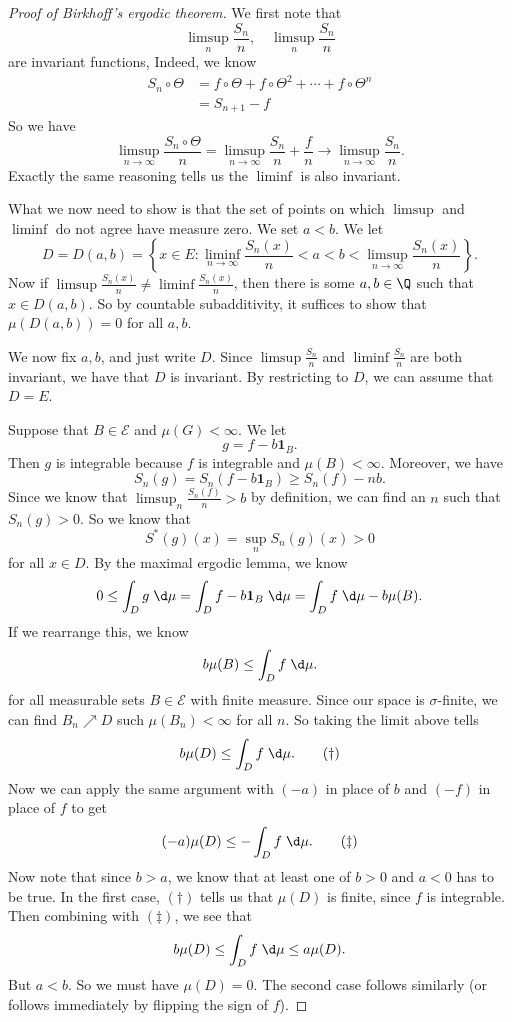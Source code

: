 \documentclass[a4paper]{article}
\begin{document}
\begin{proof}[Proof of Birkhoff's ergodic theorem]
  We first note that
  \[
    \limsup_n \frac{S_n}{n},\quad \limsup_n \frac{S_n}{n}
  \]
  are invariant functions, Indeed, we know
  \begin{align*}
    S_n \circ \Theta &= f \circ \Theta + f \circ \Theta^2 + \cdots + f \circ \Theta^n\\
    &= S_{n + 1} - f
  \end{align*}
  So we have
  \[
    \limsup_{n \to \infty} \frac{S_n \circ \Theta}{n} = \limsup_{n \to \infty} \frac{S_n}{n} + \frac{f}{n} \to \limsup_{n \to \infty} \frac{S_n}{n}.
  \]
  Exactly the same reasoning tells us the $\liminf$ is also invariant.

  What we now need to show is that the set of points on which $\limsup$ and $\liminf$ do not agree have measure zero. We set $a < b$. We let
  \[
    D = D(a, b) = \left\{x \in E: \liminf_{n \to \infty} \frac{S_n(x)}{n} < a < b < \limsup_{n \to \infty} \frac{S_n(x)}{n}\right\}.
  \]
  Now if $\limsup \frac{S_n(x)}{n} \not= \liminf \frac{S_n(x)}{n}$, then there is some $a , b \in \Q$ such that $x \in D(a, b)$. So by countable subadditivity, it suffices to show that $\mu(D(a, b)) = 0$ for all $a, b$.

  We now fix $a, b$, and just write $D$. Since $\limsup \frac{S_n}{n}$ and $\liminf \frac{S_n}{n}$ are both invariant, we have that $D$ is invariant. By restricting to $D$, we can assume that $D = E$.

  Suppose that $B \in \mathcal{E}$ and $\mu(G) < \infty$. We let
  \[
    g = f - b \mathbf{1}_B.
  \]
  Then $g$ is integrable because $f$ is integrable and $\mu(B) < \infty$. Moreover, we have
  \[
    S_n(g) = S_n(f - b \mathbf{1}_B) \geq S_n(f) - nb.
  \]
  Since we know that $\limsup_n \frac{S_n(f)}{n} > b$ by definition, we can find an $n$ such that $S_n(g) > 0$. So we know that
  \[
    S^*(g)(x) = \sup_n S_n(g)(x) > 0
  \]
  for all $x \in D$. By the maximal ergodic lemma, we know
  \[
    0 \leq \int_D g \;\d \mu = \int_D f - b \mathbf{1}_B \;\d \mu = \int_D f \;\d \mu - b \mu(B).
  \]
  If we rearrange this, we know
  \[
    b \mu(B) \leq \int_D f \;\d \mu.
  \]
  for all measurable sets $B \in \mathcal{E}$ with finite measure. Since our space is $\sigma$-finite, we can find $B_n \nearrow D$ such $\mu(B_n) < \infty$ for all $n$. So taking the limit above tells
  \[
    b \mu(D) \leq \int_D f \;\d \mu.\tag{$\dagger$}
  \]
  Now we can apply the same argument with $(-a)$ in place of $b$ and $(-f)$ in place of $f$ to get
  \[
    (-a) \mu(D) \leq -\int_D f \;\d \mu.\tag{$\ddagger$}
  \]
  Now note that since $b > a$, we know that at least one of $b > 0$ and $a < 0$ has to be true. In the first case, $(\dagger)$ tells us that $\mu(D)$ is finite, since $f$ is integrable. Then combining with $(\ddagger)$, we see that
  \[
    b \mu(D) \leq \int_D f \;\d\mu \leq a \mu(D).
  \]
  But $a < b$. So we must have $\mu(D) = 0$. The second case follows similarly (or follows immediately by flipping the sign of $f$).


\end{proof}
\end{document}
